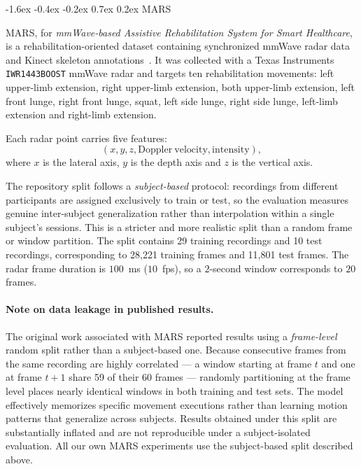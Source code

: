 \documentclass[10pt,twocolumn]{article}
\makeatletter
\renewcommand{\subsection}{%
  \@startsection{subsection}{2}{\z@}%
  {-1.6ex \@plus -0.4ex \@minus -0.2ex}%
  {0.7ex \@plus 0.2ex}%
  {\normalfont\normalsize\bfseries}}
\makeatother
\begin{document}
\subsection{MARS}
\label{sec:mars}

MARS, for \emph{mmWave-based Assistive Rehabilitation System for Smart
Healthcare}, is a rehabilitation-oriented dataset containing synchronized
mmWave radar data and Kinect skeleton annotations~\cite{an2021mars}. It was collected with a
Texas Instruments
\texttt{IWR1443BOOST} mmWave radar and targets ten rehabilitation movements:
left upper-limb extension, right upper-limb extension, both upper-limb
extension, left front lunge, right front lunge, squat, left side lunge,
right side lunge, left-limb extension and right-limb extension.

Each radar point carries five features:
\[
(x, y, z, \mathrm{Doppler\ velocity}, \mathrm{intensity}),
\]
where $x$ is the lateral axis, $y$ is the depth axis and $z$ is the
vertical axis.

The repository split follows a \emph{subject-based} protocol: recordings
from different participants are assigned exclusively to train or test, so
the evaluation measures genuine inter-subject generalization rather than
interpolation within a single subject's sessions. This is a stricter and
more realistic split than a random frame or window partition. The split
contains 29 training recordings and 10 test recordings, corresponding to
28,221 training frames and 11,801 test frames. The radar frame duration is
$100$~ms ($10$~fps), so a $2$-second window corresponds to $20$ frames.

\paragraph{Note on data leakage in published results.}
The original work associated with MARS reported results using a
\emph{frame-level} random split rather than a subject-based one.
Because consecutive frames from the same recording are highly correlated
--- a window starting at frame $t$ and one at frame $t+1$ share 59 of
their 60 frames --- randomly partitioning at the frame level places
nearly identical windows in both training and test sets. The model
effectively memorizes specific movement executions rather than learning
motion patterns that generalize across subjects. Results obtained under
this split are substantially inflated and are not reproducible under a
subject-isolated evaluation. All our own MARS experiments use the
subject-based split described above.
\end{document}
